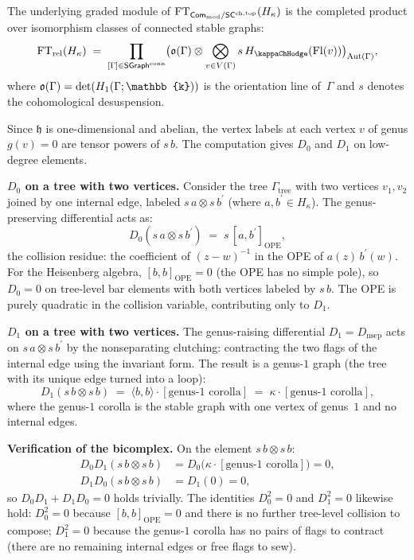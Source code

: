 \begin{example}
\label{ex:rft-heisenberg}
The underlying graded module of
$\mathrm{FT}_{\mathsf{Com}_{\mathrm{mod}} / \mathsf{SC}^{\mathrm{ch,top}}}(H_\kappa)$ is the
completed product over isomorphism classes of connected stable
graphs:
\[
\FT_{\mathrm{rel}}(H_\kappa) \;=\;
\prod_{[\Gamma] \in \StGraph^{\mathrm{conn}}}
\bigl(\orline(\Gamma) \otimes
\bigotimes_{v \in V(\Gamma)} s\, H_\kappaChHodge(\mathrm{Fl}(v))
\bigr)_{\Aut(\Gamma)},
\]
where $\orline(\Gamma) = \det(H_1(\Gamma;\mathbb{k}))$ is the
orientation line of~$\Gamma$ and $s$ denotes the cohomological
desuspension.

Since $\mathfrak{h}$ is one-dimensional and abelian, the vertex
labels at each vertex $v$ of genus $g(v) = 0$ are tensor powers
of $s\,b$. The computation gives $D_0$ and $D_1$ on low-degree elements.

\smallskip\noindent
\textbf{$D_0$ on a tree with two vertices.}
Consider the tree $\Gamma_{\mathrm{tree}}$ with two vertices
$v_1, v_2$ joined by one internal edge, labeled
$s\,a \otimes s\,b^\prime$ (where $a, b^\prime \in H_\kappa$).
The genus-preserving differential acts as:
\[
D_0(s\,a \otimes s\,b^\prime)
\;=\;
s\,[a, b^\prime]_{\mathrm{OPE}},
\]
the collision residue: the coefficient of $(z-w)^{-1}$ in the
OPE of $a(z)\, b^\prime(w)$. For the Heisenberg algebra,
$[b, b]_{\mathrm{OPE}} = 0$ (the OPE has no simple pole), so
$D_0 = 0$ on tree-level bar elements with both vertices labeled
by $s\,b$. The OPE is purely quadratic in the collision
variable, contributing only to $D_1$.

\smallskip\noindent
\textbf{$D_1$ on a tree with two vertices.}
The genus-raising differential $D_1 = D_{\mathrm{nsep}}$ acts
on $s\,a \otimes s\,b^\prime$ by the nonseparating clutching:
contracting the two flags of the internal edge using the
invariant form. The result is a genus-$1$ graph (the tree
with its unique edge turned into a loop):
\[
D_1(s\,b \otimes s\,b)
\;=\;
\langle b, b \rangle \cdot [\text{genus-$1$ corolla}]
\;=\;
\kappa \cdot [\text{genus-$1$ corolla}],
\]
where the genus-$1$ corolla is the stable graph with one vertex
of genus~$1$ and no internal edges.

\smallskip\noindent
\textbf{Verification of the bicomplex.}
On the element $s\,b \otimes s\,b$:
\begin{align*}
D_0 D_1(s\,b \otimes s\,b)
&= D_0\bigl(\kappa \cdot [\text{genus-$1$ corolla}]\bigr)
= 0, \\
D_1 D_0(s\,b \otimes s\,b)
&= D_1(0)
= 0,
\end{align*}
so $D_0 D_1 + D_1 D_0 = 0$ holds trivially. The identities
$D_0^2 = 0$ and $D_1^2 = 0$ likewise hold: $D_0^2 = 0$
because $[b,b]_{\mathrm{OPE}} = 0$ and there is no further
tree-level collision to compose; $D_1^2 = 0$ because the
genus-$1$ corolla has no pairs of flags to contract (there are
no remaining internal edges or free flags to sew).


\end{example}

